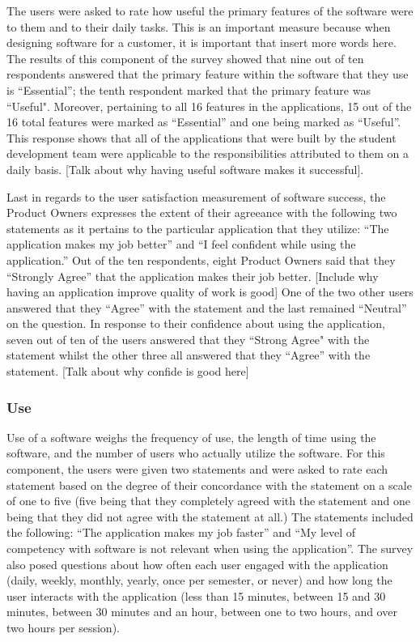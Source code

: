 The users were asked to rate how useful the primary features of the software were to them and to their daily tasks. This is an important measure because when designing software for a customer, it is important that {insert more words here}. The results of this component of the survey showed that nine out of ten respondents answered that the primary feature within the software that they use is ``Essential''; the tenth respondent marked that the primary feature was ``Useful". Moreover, pertaining to all 16 features in the applications, 15 out of the 16 total features were marked as ``Essential'' and one being marked as ``Useful''. This response shows that all of the applications that were built by the student development team were applicable to the responsibilities attributed to them on a daily basis. [Talk about why having useful software makes it successful].

Last in regards to the user satisfaction measurement of software success, the Product Owners expresses the extent of their agreeance with the following two statements as it pertains to the particular application that they utilize: ``The application makes my job better'' and ``I feel confident while using the application.'' Out of the ten respondents, eight Product Owners said that they ``Strongly Agree'' that the application makes their job better. [Include why having an application improve quality of work is good] One of the two other users answered that they ``Agree'' with the statement and the last remained ``Neutral'' on the question. In response to their confidence about using the application, seven out of ten of the users answered that they ``Strong Agree" with the statement whilst the other three all answered that they ``Agree'' with the statement. [Talk about why confide is good here]

 \subsubsection{Use}
Use of a software weighs the frequency of use, the length of time using the software, and the number of users who actually utilize the software. For this component, the users were given two statements and were asked to rate each statement based on the degree of  their concordance with the statement on a scale of one to five (five being that they completely agreed with the statement and one being that they did not agree with the statement at all.) The statements included the following: ``The application makes my job faster'' and ``My level of competency with software is not relevant when using the application''. The survey also posed questions about how often each user engaged with the application (daily, weekly, monthly, yearly, once per semester, or never)  and how long the user interacts with the application (less than 15 minutes, between 15 and 30 minutes, between 30 minutes and an hour, between one to two hours, and over two hours per session).

